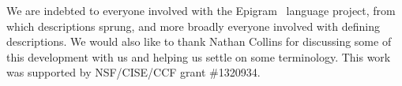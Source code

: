 \documentclass[preprint,nonatbib]{sigplanconf}
\begin{document}
\acks

We are indebted to everyone involved with the
{\sc Epigram}~\citep{mcbride2005epigram} language project, from which
descriptions sprung, and more broadly everyone involved with defining
descriptions.
We would also like to thank Nathan Collins for discussing some of this
development with us and helping us settle on some terminology. This
work was supported by NSF/CISE/CCF grant \#1320934.



\end{document}

